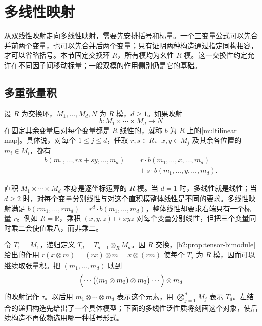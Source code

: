 
\section{多线性映射}
\label{b2:sec:0801}

从双线性映射走向多线性映射，需要先安排括号和标量。一个三变量公式可以先合并前两个变量，也可以先合并后两个变量；只有证明两种构造通过指定同构相容，才可以省略括号。本节固定交换环 \(R\)，所有模均为幺性 \(R\) 模。这一交换性约定允许在不同因子间移动标量；一般双模的作用侧别仍是它的基础。

%
%

\subsection{多重张量积}
\label{b2:subsec:0801:01}

\begin{definition}\label{b2:def:multilinear-map}
	设 \(R\) 为交换环，\(M_1,\ldots,M_d,N\) 为 \(R\) 模，\(d\ge1\)。如果映射
	\[
		b:M_1\times\cdots\times M_d\longrightarrow N
	\]
	在固定其余变量后对每个变量都是 \(R\) 线性的，就称 \(b\) 为 \(R\) 上的[multilinear map]。具体说，对每个 \(1\le j\le d\)，任取 \(r,s\in R\)、\(x,y\in M_j\) 及其余各位置的 \(m_i\in M_i\)，都有
	\[
		\begin{aligned}
			b(m_1,\ldots,rx+sy,\ldots,m_d) &=r\cdot b(m_1,\ldots,x,\ldots,m_d)\\
			&\quad+s\cdot b(m_1,\ldots,y,\ldots,m_d).
		\end{aligned}
	\]
\end{definition}

直积 \(M_1\times\cdots\times M_d\) 本身是逐坐标运算的 \(R\) 模。当 \(d=1\) 时，多线性就是线性；当 \(d\ge2\) 时，对每个变量分别线性与对这个直积模整体线性是不同的要求。多线性映射满足 \(b(rm_1,\ldots,rm_d)=r^d\cdot b(m_1,\ldots,m_d)\)，整体线性却要求右端只有一个标量 \(r\)。例如 \(R=\mathbb R\)，乘积 \((x,y,z)\mapsto xyz\) 对每个变量分别线性，但把三个变量同时乘二会使值乘八，而非乘二。

\ProseParagraphBreak
令 \(T_1=M_1\)，递归定义 \(T_d=T_{d-1}\otimes_RM_d\)。因 \(R\) 交换，\cref{b2:prop:tensor-bimodule}给出的作用 \(r(x\otimes m)=(rx)\otimes m=x\otimes(rm)\) 使每个 \(T_j\) 为 \(R\) 模，因而可以继续取张量积。把 \((m_1,\ldots,m_d)\) 映到
\[
	\Bigl(\cdots\bigl((m_1\otimes m_2)\otimes m_3\bigr)\cdots\Bigr)\otimes m_d
\]
的映射记作 \(\tau\)。以后用 \(m_1\otimes\cdots\otimes m_d\) 表示这个元素，用 \(\bigotimes_{j=1}^d M_j\) 表示 \(T_d\)。左结合的递归构造先给出了一个具体模型；下面的多线性泛性质将刻画这个对象，使后续构造不再依赖选用哪一种括号形式。

